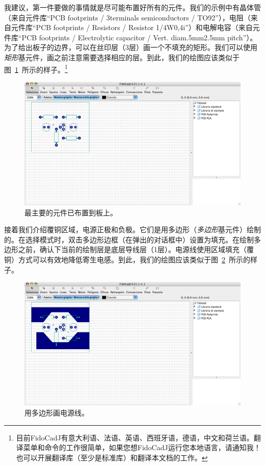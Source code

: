 \documentclass[10pt,a4paper,twoside]{scrreprt}
\begin{document}
我建议，第一件要做的事情就是尽可能布置好所有的元件。我们的示例中有晶体管（来自元件库{}“PCB footprints / 3terminals semiconductors / TO92”），电阻（来自元件库{}“PCB footprints / Resistors / Resistor 1/4W0,4i”）和电解电容（来自元件库{}“PCB footprints / Electrolytic capacitor / Vert. diam.5mm2.5mm pitch”）。为了给出板子的边界，可以在丝印层（3层）画一个不填充的矩形。我们可以使用\emph{矩形}基元件，画之前注意需要选择相应的层。到此，我们的绘图应该类似于图~\ref{fig_amplificateur_phase1}~所示的样子。\footnote{目前FidoCadJ有意大利语、法语、英语、西班牙语，德语，中文和荷兰语。翻译菜单和命令的工作很简单，如果您想FidoCadJ运行您本地语言，请通知我！也可以开展翻译库（至少是标准库）和翻译本文档的工作。}

\begin{figure}
\includegraphics[width=1\textwidth]{amplificateur_phase1} 
\caption{最主要的元件已布置到板上。}
\label{fig_amplificateur_phase1} 
\end{figure}

接着我们介绍覆铜区域，电源正极和负极。它们是用多边形（\emph{多边形}基元件）绘制的。在选择模式时，双击多边形边框（在弹出的对话框中）设置为填充。在绘制多边形之前，确认下当前的绘制层是底层导线层（1层）。电源线使用区域填充（覆铜）方式可以有效地降低寄生电感。到此，我们的绘图应该类似于图~\ref{fig_amplificateur_phase2}~所示的样子。

\begin{figure}
\includegraphics[width=1\textwidth]{amplificateur_phase2} 
\caption{用多边形画电源线。}
\label{fig_amplificateur_phase2} 
\end{figure}
\end{document}
